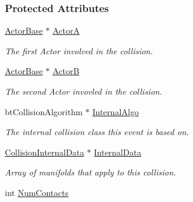 \subsubsection*{Protected Attributes}
\begin{DoxyCompactItemize}
\item 
\hypertarget{classMezzanine_1_1Collision_ae5040098b1a04efc5e91bd3911fceec2}{
\hyperlink{classMezzanine_1_1ActorBase}{ActorBase} $\ast$ \hyperlink{classMezzanine_1_1Collision_ae5040098b1a04efc5e91bd3911fceec2}{ActorA}}
\label{classMezzanine_1_1Collision_ae5040098b1a04efc5e91bd3911fceec2}

\begin{DoxyCompactList}\small\item\em The first Actor involved in the collision. \item\end{DoxyCompactList}\item 
\hypertarget{classMezzanine_1_1Collision_aadf626c39ecec30c38caced1629cb398}{
\hyperlink{classMezzanine_1_1ActorBase}{ActorBase} $\ast$ \hyperlink{classMezzanine_1_1Collision_aadf626c39ecec30c38caced1629cb398}{ActorB}}
\label{classMezzanine_1_1Collision_aadf626c39ecec30c38caced1629cb398}

\begin{DoxyCompactList}\small\item\em The second Actor invovled in the collision. \item\end{DoxyCompactList}\item 
\hypertarget{classMezzanine_1_1Collision_a6326964a8f8601655d97efc231ec3f86}{
btCollisionAlgorithm $\ast$ \hyperlink{classMezzanine_1_1Collision_a6326964a8f8601655d97efc231ec3f86}{InternalAlgo}}
\label{classMezzanine_1_1Collision_a6326964a8f8601655d97efc231ec3f86}

\begin{DoxyCompactList}\small\item\em The internal collision class this event is based on. \item\end{DoxyCompactList}\item 
\hypertarget{classMezzanine_1_1Collision_ac4a67a946284d3bacbd342b935495b57}{
\hyperlink{structMezzanine_1_1CollisionInternalData}{CollisionInternalData} $\ast$ \hyperlink{classMezzanine_1_1Collision_ac4a67a946284d3bacbd342b935495b57}{InternalData}}
\label{classMezzanine_1_1Collision_ac4a67a946284d3bacbd342b935495b57}

\begin{DoxyCompactList}\small\item\em Array of manifolds that apply to this collision. \item\end{DoxyCompactList}\item 
\hypertarget{classMezzanine_1_1Collision_a4cc057f249b1694ac66d1a64d7a437b9}{
int \hyperlink{classMezzanine_1_1Collision_a4cc057f249b1694ac66d1a64d7a437b9}{NumContacts}}
\label{classMezzanine_1_1Collision_a4cc057f249b1694ac66d1a64d7a437b9}


\end{DoxyCompactItemize}
